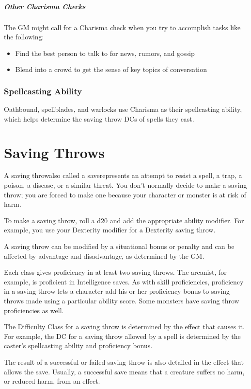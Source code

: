 \subparagraph*{Other Charisma Checks} The GM might call for a Charisma check when you try to accomplish tasks like the following:

\begin{itemize}
    \item Find the best person to talk to for news, rumors, and gossip
    \item Blend into a crowd to get the sense of key topics of conversation
\end{itemize}

\subsubsection{Spellcasting Ability}

Oathbound, spellblades, and warlocks use Charisma as their spellcasting ability, which helps determine the saving throw DCs of spells they cast.

\section{Saving Throws}
A saving throw\textemdash also called a save\textemdash represents an attempt to resist a spell, a trap, a poison, a disease, or a similar threat. You don't normally decide to make a saving throw; you are forced to make one because your character or monster is at risk of harm.

To make a saving throw, roll a d20 and add the appropriate ability modifier. For example, you use your Dexterity modifier for a Dexterity saving throw.

A saving throw can be modified by a situational bonus or penalty and can be affected by advantage and disadvantage, as determined by the GM.

Each class gives proficiency in at least two saving throws. The arcanist, for example, is proficient in Intelligence saves. As with skill proficiencies, proficiency in a saving throw lets a character add his or her proficiency bonus to saving throws made using a particular ability score. Some monsters have saving throw proficiencies as well.

The Difficulty Class for a saving throw is determined by the effect that causes it. For example, the DC for a saving throw allowed by a spell is determined by the caster's spellcasting ability and proficiency bonus.

The result of a successful or failed saving throw is also detailed in the effect that allows the save. Usually, a successful save means that a creature suffers no harm, or reduced harm, from an effect.

